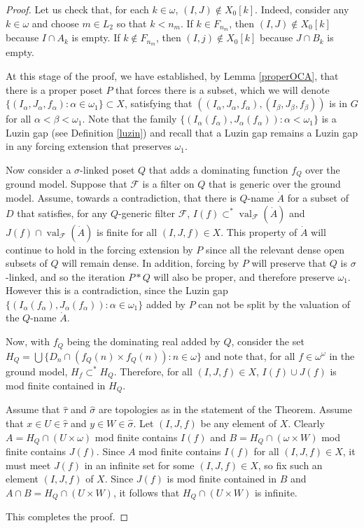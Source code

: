 \documentclass{amsart}
\theoremstyle{definition}
\theoremstyle{remark}
\def\val{\operatorname{val}}
\begin{document}
\begin{proof}
          Let us check that, for each $k\in \omega$, $(I,J)\notin X_0[k]$.
Indeed, consider any $k\in \omega$ and choose $          m\in L_2$
so that $k<n_m$.  If $k\in F_{n_m}$, then $(I,J)\notin X_0[k]$
because $I\cap A_k$ is empty.  If $k\notin F_{n_m}$, then $(I,j)\notin
 X_0[k]$ because $J\cap B_k$ is empty.
 \medskip

 At this stage of the proof, we have established, by 
 Lemma \ref{properOCA}, that there is a proper poset $P$ that forces
 there is a subset, which we will denote 
  $\{ (I_\alpha,J_\alpha, f_\alpha) : \alpha\in\omega_1\}\subset X$,
  satisfying that $((I_\alpha,J_\alpha,f_\alpha), (I_\beta,J_\beta,f_\beta))$
  is in $G$ for all $\alpha < \beta < \omega_1$. 
  Note that the family $\{ (I_\alpha(f_\alpha), J_\alpha(f_\alpha)) : \alpha
  <\omega_1\}$ is a Luzin gap (see Definition \ref{luzin}) and recall 
  that a Luzin gap remains a Luzin gap in any forcing extension that
  preserves $\omega_1$. 
  
  Now consider a
  $\sigma$-linked poset $Q$ that adds a dominating function $f_Q$ over
  the ground model. Suppose that $\mathcal F$ is a   filter
  on $Q$ that is generic over the ground model.  Assume,
  towards a contradiction, 
  that there is $Q$-name $\dot A$ for a subset of $D$
 that satisfies, for any $Q$-generic filter $\mathcal F$,
   $ I(f)  \subset^* \val_{\mathcal F}(\dot 
   A)$ and
    $J(f) \cap \val_{\mathcal F}(\dot A)$ is finite
   for all $(I,J,f)\in X$. This property of $\dot A$ will continue
    to hold in the forcing extension by $P$ since all
    the relevant dense open subsets of $Q$ will remain dense.
In addition, forcing by $P$ will preserve that $Q$ 
is $\sigma$-linked, and so the iteration $P * Q$ will also
be proper, and therefore preserve $\omega_1$.
However this is a contradiction, since the Luzin  gap
   $\{ (I_\alpha(f_\alpha),J_\alpha( f_\alpha)) : \alpha\in\omega_1\}$
 added by $P$  can not be split by the valuation
 of the $Q$-name $\dot A$.
    
  Now, with $f_Q$ being the dominating real added by $Q$,
   consider the set $H_{Q} = \bigcup \{ D_n\cap (f_Q(n)\times f_Q(n)) : n\in \omega\}$
   and note that, for all $f\in\omega^\omega$ in the ground model,
   $H_f \subset^* H_Q$.  Therefore, for all
  $(I,J,f)\in X$,   $I(f)\cup J(f)$ is mod finite contained in $H_Q$.   

   Assume that $\hat\tau $ and $\hat \sigma $ are topologies as in the statement
   of the Theorem. Assume that $x\in U\in \hat\tau $ and $y\in W\in\hat\sigma $.
   Let $(I,J,f)$ be any element of $X$.
   Clearly $A = H_Q\cap (U\times \omega)$ mod finite contains $I(f)$
   and $B = H_Q\cap (\omega\times W)$ mod finite contains $J(f)$.
   Since $A$ mod finite contains $I(f)$ for all 
    $(I,J,f)\in X$, it must meet $J(f)$ in an infinite
    set for some $(I,J,f)\in X$, so fix such an
    element $(I,J,f)$ of $X$. 
    Since $J(f)$ is mod finite contained in $B$ 
    and $A\cap B = H_Q\cap (U\times W)$, it follows
    that $H_Q\cap (U\times W)$ is infinite.
    
This completes the proof.           
\end{proof}
\end{document}
